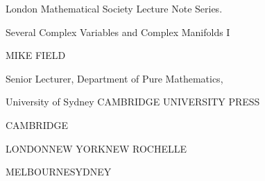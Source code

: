 \clearpage
\begingroup
    \thispagestyle{empty}
    \noindent London Mathematical Society Lecture Note Series.
    \vfill
    {\Huge\bfseries\raggedright Several Complex Variables and Complex Manifolds I\par}
    \vspace{2cm}
    {\Large MIKE FIELD\par}
    Senior Lecturer, Department of Pure Mathematics,\par
    University of Sydney
    \vfill
    CAMBRIDGE UNIVERSITY PRESS\par\medskip
    CAMBRIDGE\par\medskip
    LONDON\quad NEW YORK\quad NEW ROCHELLE\par\medskip
    MELBOURNE\quad SYDNEY
    \clearpage
\endgroup
